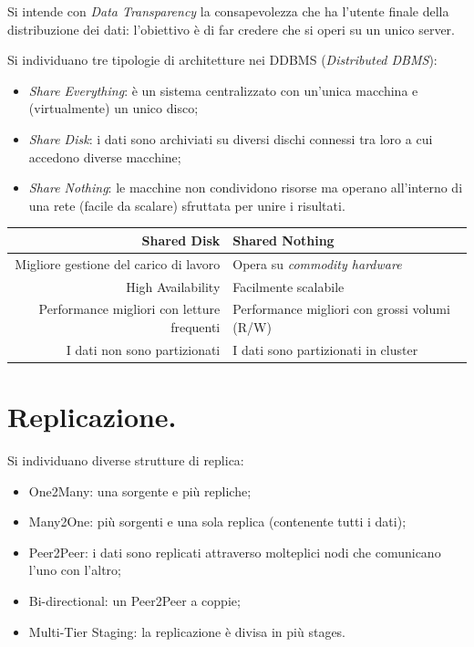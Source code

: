 \documentclass[a4page, 11pt]{article}
\begin{document}
Si intende con \textit{Data Transparency} la consapevolezza che ha l'utente finale della distribuzione dei dati: l'obiettivo è di far credere che si operi su un unico server. \newline

Si individuano tre tipologie di architetture nei DDBMS (\textit{Distributed DBMS}):
\begin{itemize}
\item \textit{Share Everything}: è un sistema centralizzato con un'unica macchina e (virtualmente) un unico disco;
\item \textit{Share Disk}: i dati sono archiviati su diversi dischi connessi tra loro a cui accedono diverse macchine;
\item \textit{Share Nothing}: le macchine non condividono risorse ma operano all'interno di una rete (facile da scalare) sfruttata per unire i risultati.
\end{itemize}


\begin{center}
  \begin{tabular}{r|l}
    \textbf{Shared Disk} & \textbf{Shared Nothing} \\
    \hline
    Migliore gestione del carico di lavoro & Opera su \textit{commodity hardware}  \\
    High Availability & Facilmente scalabile \\
    Performance migliori con letture frequenti & Performance migliori con grossi volumi (R/W) \\
    I dati non sono partizionati & I dati sono partizionati in cluster
  \end{tabular}
\end{center}

\section{Replicazione.}
Si individuano diverse strutture di replica:
\begin{itemize}
\item One2Many: una sorgente e più repliche;
\item Many2One: più sorgenti e una sola replica (contenente tutti i dati);
\item Peer2Peer: i dati sono replicati attraverso molteplici nodi che comunicano l'uno con l'altro;
\item Bi-directional: un Peer2Peer a coppie;
\item Multi-Tier Staging: la replicazione è divisa in più stages.
\end{itemize}
\end{document}
